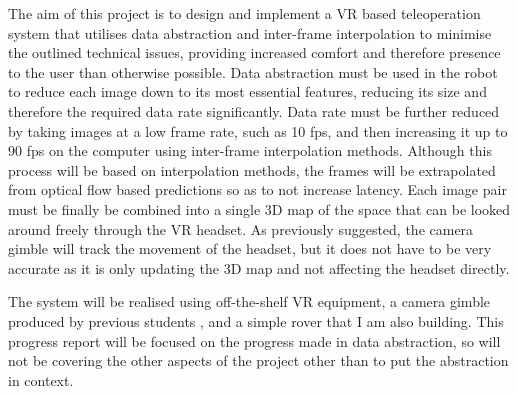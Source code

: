 The aim of this project is to design and implement a VR based teleoperation system that utilises data abstraction and inter-frame interpolation to minimise the outlined technical issues, providing increased comfort and therefore presence to the user than otherwise possible. Data abstraction must be used in the robot to reduce each image down to its most essential features, reducing its size and therefore the required data rate significantly. Data rate must be further reduced by taking images at a low frame rate, such as 10 fps, and then increasing it up to 90 fps on the computer using inter-frame interpolation methods. Although this process will be based on interpolation methods, the frames will be extrapolated from optical flow based predictions so as to not increase latency. Each image pair must be finally be combined into a single 3D map of the space that can be looked around freely through the VR headset. As previously suggested, the camera gimble will track the movement of the headset, but it does not have to be very accurate as it is only updating the 3D map and not affecting the headset directly.

The system will be realised using off-the-shelf VR equipment, a camera gimble produced by previous students \cite{gimble}, and a simple rover that I am also building. This progress report will be focused on the progress made in data abstraction, so will not be covering the other aspects of the project other than to put the abstraction in context.